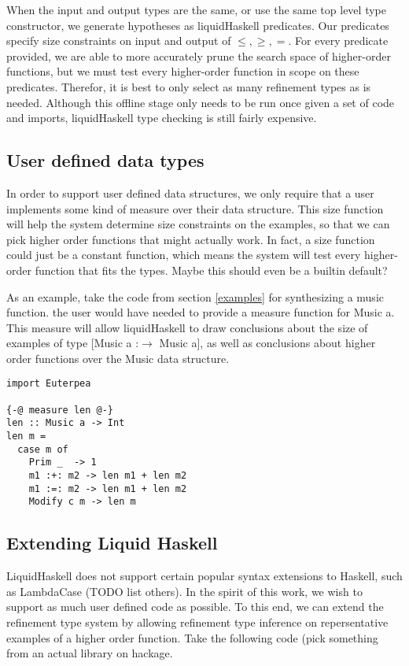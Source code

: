 When the input and output types are the same, or use the same top level type constructor, we generate hypotheses as liquidHaskell predicates.
Our predicates specify size constraints on input and output of $\leq,\geq,=$.
For every predicate provided, we are able to more accurately prune the search space of higher-order functions, but we must test every higher-order function in scope on these predicates. 
Therefor, it is best to only select as many refinement types as is needed.
Although this offline stage only needs to be run once given a set of code and imports, liquidHaskell type checking is still fairly expensive.



\subsection{User defined data types}
In order to support user defined data structures, we only require that a user implements some kind of measure\cite{realWorldLiquid} over their data structure.
This size function will help the system determine size constraints on the examples, so that we can pick higher order functions that might actually work.
In fact, a size function could just be a constant function, which means the system will test every higher-order function that fits the types. 
Maybe this should even be a builtin default?

As an example, take the code from section \ref{examples} for synthesizing a music function.
the user would have needed to provide a measure function for Music a.
This measure will allow liquidHaskell to draw conclusions about the size of examples of type [Music a :$\to$ Music a], as well as conclusions about higher order functions over the Music data structure.

\begin{verbatim}
import Euterpea

{-@ measure len @-}
len :: Music a -> Int
len m =
  case m of
    Prim _  -> 1
    m1 :+: m2 -> len m1 + len m2
    m1 :=: m2 -> len m1 + len m2
    Modify c m -> len m
\end{verbatim}


\subsection{Extending Liquid Haskell
}%
LiquidHaskell does not support certain popular syntax extensions to Haskell, such as LambdaCase (TODO list others). In the spirit of this work, we wish to support as much user defined code as possible. To this end, we can extend the refinement type system by allowing refinement type inference on repersentative examples of a higher order function. Take the following code (pick something from an actual library on hackage.

